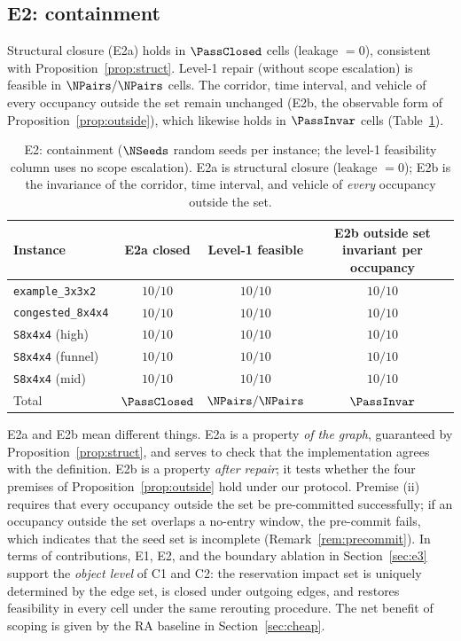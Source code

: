 \subsection{E2: containment}
\label{sec:e2}

Structural closure (E2a) holds in \(\PassClosed\) cells (leakage \(=0\)), consistent with Proposition~\ref{prop:struct}.
Level-1 repair (without scope escalation) is feasible in \(\NPairs/\NPairs\) cells.
The corridor, time interval, and vehicle of every occupancy outside the set remain unchanged (E2b, the observable form of Proposition~\ref{prop:outside}), which likewise holds in \(\PassInvar\) cells
(Table~\ref{tab:e2}).

\begin{table}[t]
\centering
\caption{E2: containment (\(\NSeeds\) random seeds per instance; the level-1 feasibility column uses no scope escalation).
E2a is structural closure (leakage \(=0\));
E2b is the invariance of the corridor, time interval, and vehicle of \emph{every} occupancy outside the set.}
\label{tab:e2}
\small
\begin{tabular}{@{}lccc@{}}
\toprule
Instance & E2a closed & Level-1 feasible & \makecell{E2b outside set\\invariant per occupancy} \\
\midrule
\texttt{example\_3x3x2}   & \(10/10\) & \(10/10\) & \(10/10\) \\
\texttt{congested\_8x4x4} & \(10/10\) & \(10/10\) & \(10/10\) \\
\texttt{S8x4x4} (high)    & \(10/10\) & \(10/10\) & \(10/10\) \\
\texttt{S8x4x4} (funnel)  & \(10/10\) & \(10/10\) & \(10/10\) \\
\texttt{S8x4x4} (mid)     & \(10/10\) & \(10/10\) & \(10/10\) \\
\midrule
Total & \(\PassClosed\) & \(\NPairs/\NPairs\) & \(\PassInvar\) \\
\bottomrule
\end{tabular}
\end{table}

E2a and E2b mean different things. E2a is a property \emph{of the graph}, guaranteed by Proposition~\ref{prop:struct},
and serves to check that the implementation agrees with the definition. E2b is a property \emph{after repair}; it tests whether the four premises of Proposition~\ref{prop:outside}
hold under our protocol. Premise (ii) requires that every occupancy outside the set be pre-committed successfully; if an occupancy outside the set overlaps a no-entry window,
the pre-commit fails, which indicates that the seed set is incomplete (Remark~\ref{rem:precommit}).
In terms of contributions, E1, E2, and the boundary ablation in Section~\ref{sec:e3} support the \emph{object level} of C1 and C2: the reservation impact set
is uniquely determined by the edge set, is closed under outgoing edges, and restores feasibility in every cell under the same rerouting procedure. The net benefit of scoping is given by
the RA baseline in Section~\ref{sec:cheap}.

